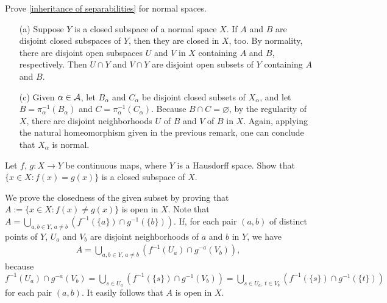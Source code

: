 \begin{prob}\label{inheritance: normal}
    Prove \cref{inheritance of separabilities} for normal spaces.
\end{prob}
\begin{sol}
    \begin{enumerate}
        \item[(a)]
        {    
            Suppose $Y$ is a closed subspace of a normal space $X$.
            If $A$ and $B$ are disjoint closed subspaces of $Y$, then they are closed in $X$, too.
            By normality, there are disjoint open subspaces $U$ and $V$ in $X$ containing $A$ and $B$, respectively.
            Then $U\cap Y$ and $V\cap Y$ are disjoint open subsets of $Y$ containing $A$ and $B$.
        }
        \item[(c)]
        {
            Given $\alpha\in{\mathcal{A}}$, let $B_\alpha$ and $C_\alpha$ be disjoint closed subsets of $X_\alpha$, and let $B=\pi_\alpha^{-1}(B_\alpha)$ and $C=\pi_\alpha^{-1}(C_\alpha)$.
            Because $B\cap C=\varnothing$, by the regularity of $X$, there are disjoint neighborhoods $U$ of $B$ and $V$ of $B$ in $X$.
            Again, applying the natural homeomorphism given in the previous remark, one can conclude that $X_\alpha$ is normal.
        }
    \end{enumerate}
\end{sol}

\begin{prob}
    Let $f,\,g: X\rightarrow Y$ be continuous maps, where $Y$ is a Hausdorff space.
    Show that $\{x\in X: f(x)=g(x)\}$ is a closed subspace of $X$.
\end{prob}
\begin{sol}
    We prove the closedness of the given subset by proving that $A:=\{x\in X: f(x)\neq g(x)\}$ is open in $X$.
    Note that $A=\bigcup_{a, b\in Y,\, a\neq b}(f^{-1}(\{a\})\cap g^{-1}(\{b\}))$.
    If, for each pair $(a, b)$ of distinct points of $Y$, $U_a$ and $V_b$ are disjoint neighborhoods of $a$ and $b$ in $Y$, we have
    \begin{align*}
        A=\bigcup_{a, b\in Y,\, a\neq b} (f^{-1}(U_a)\cap g^{-a}(V_b)),
    \end{align*}
    because $f^{-1}(U_a)\cap g^{-a}(V_b)=\bigcup_{s\in U_a}\left(f^{-1}(\{s\})\cap g^{-1}(V_b)\right)=\bigcup_{s\in U_a,\, t\in V_b}(f^{-1}(\{s\})\cap g^{-1}(\{t\}))$ for each pair $(a, b)$.
    It easily follows that $A$ is open in $X$.
\end{sol}

